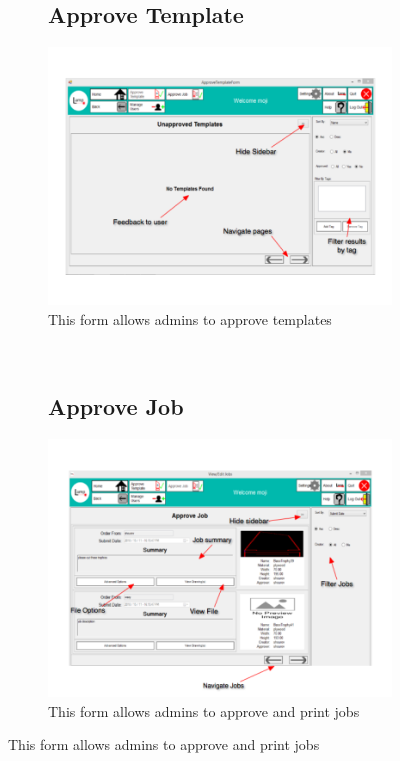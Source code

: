 \documentclass[oneside,openany,11pt,a4paper]{report}
\begin{document}
\begin{figure}[H]
	\begin{subfigure}[t]{0.5\textwidth}
		\subsection{Approve Template}

			\centering
			\includegraphics[width=\textwidth]{screen/approvetemplate.png}
			\caption{This form allows admins to approve templates}
		
	\end{subfigure}
	~
	\begin{subfigure}[t]{0.5\textwidth}
		\subsection{Approve Job}

			\centering
			\includegraphics[width=\textwidth]{screen/approvejobs.png}
			\caption{This form allows admins to approve and print jobs}

		
	\end{subfigure}
\end{figure}
\end{document}
